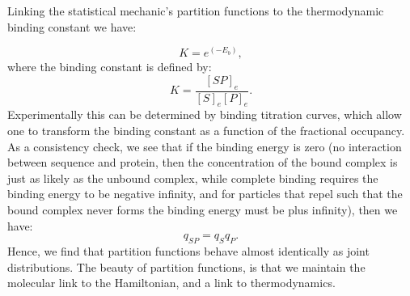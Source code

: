 Linking the statistical mechanic's partition functions to the thermodynamic binding constant we have:

\begin{equation}\label{k}
 K = e^{(-E_b)},
\end{equation}
where the binding constant is defined by:
\begin{equation}\label{k}
K=\frac{ [SP]_e }{[S]_e [P]_e}.
\end{equation}
   Experimentally this can be determined by binding titration curves, which allow one to transform the binding constant as a function of the fractional occupancy.  As a consistency check, we see that if the binding energy is zero (no interaction between sequence and protein, then the concentration of the bound complex is just as likely as the unbound complex, while complete binding requires the binding energy to be negative infinity, and for particles that repel such that the bound complex never forms the binding energy must be plus infinity), then we have:
\begin{equation}\label{}
  q_{SP} = q_S q_P.
\end{equation}
Hence, we find that partition functions behave almost identically as joint distributions.  The beauty of partition functions, is that we maintain the molecular link to the Hamiltonian, and a link to thermodynamics.


